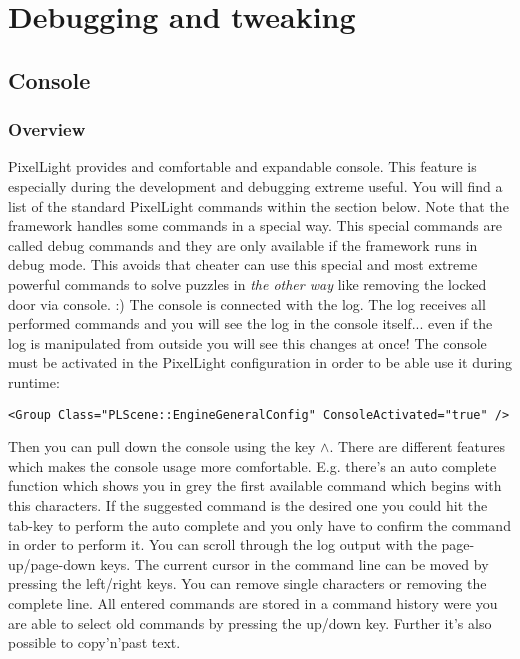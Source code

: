 \chapter{Debugging and tweaking}



\section{Console}


\subsection{Overview}
PixelLight provides and comfortable and expandable console. This feature is especially during the development and debugging extreme useful. You will find a list of the standard PixelLight commands within the section below. Note that the framework handles some commands in a special way. This special commands are called debug commands and they are only available if the framework runs in debug mode. This avoids that cheater can use this special and most extreme powerful commands to solve puzzles in \emph{the other way} like removing the locked door via console. :) The console is connected with the log. The log receives all performed commands and you will see the log in the console itself... even if the log is manipulated from outside you will see this changes at once! The console must be activated in the PixelLight configuration in order to be able use it during runtime:

\begin{lstlisting}[caption=Activate the console within the PixelLight configuration]
<Group Class="PLScene::EngineGeneralConfig" ConsoleActivated="true" />
\end{lstlisting}

Then you can pull down the console using the key \(\land\). There are different features which makes the console usage more comfortable. E.g. there's an auto complete function which shows you in grey the first available command which begins with this characters. If the suggested command is the desired one you could hit the tab-key to perform the auto complete and you only have to confirm the command in order to perform it. You can scroll through the log output with the page-up/page-down keys. The current cursor in the command line can be moved by pressing the left/right keys. You can remove single characters or removing the complete line. All entered commands are stored in a command history were you are able to select old commands by pressing the up/down key. Further it's also possible to copy'n'past text.


